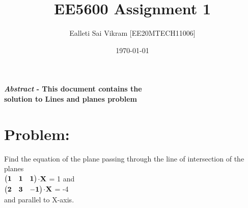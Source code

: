 \documentclass[twocolumn]{article}
\let\vec\mathbf
\begin{document}
\title{EE5600 Assignment 1}
\author{Ealleti Sai Vikram [EE20MTECH11006]}
\date{\today}
\maketitle

\textbf{\emph{Abstract} - This document contains the \\solution to Lines and planes problem}



\section*{Problem:}
Find the equation of the plane passing through
the line of intersection of the planes
\\   
\hspace*{2cm}  
$\begin{pmatrix}{\bf1}&{\bf1}&{\bf1}\end{pmatrix}$$\cdot$${\bf \vec{X}}$ = 1  and
\\
\hspace*{1.9cm}
$\begin{pmatrix}{\bf2}&{\bf 3}&{\bf -1}\end{pmatrix}$$\cdot$${\bf \vec{X}}$ = -4
\\
and parallel to X-axis.
\end{document}
